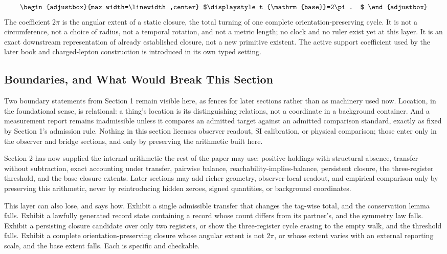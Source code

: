 \begin{equation*}
\begin{adjustbox}{max width=\linewidth,center}
$\displaystyle
t_{\mathrm{base}}=2\pi .
$
\end{adjustbox}
\end{equation*}
The coefficient \(2\pi\) is the angular extent of a static closure, the total turning of one complete orientation-preserving cycle. It is not a circumference, not a choice of radius, not a temporal rotation, and not a metric length; no clock and no ruler exist yet at this layer. It is an exact downstream representation of already established closure, not a new primitive existent. The active support coefficient used by the later book and charged-lepton construction is introduced in its own typed setting.

\subsection{Boundaries, and What Would Break This Section}
Two boundary statements from Section 1 remain visible here, as fences for later sections rather than as machinery used now. Location, in the foundational sense, is relational: a thing's location is its distinguishing relations, not a coordinate in a background container. And a measurement report remains inadmissible unless it compares an admitted target against an admitted comparison standard, exactly as fixed by Section 1's admission rule. Nothing in this section licenses observer readout, SI calibration, or physical comparison; those enter only in the observer and bridge sections, and only by preserving the arithmetic built here.

Section 2 has now supplied the internal arithmetic the rest of the paper may use: positive holdings with structural absence, transfer without subtraction, exact accounting under transfer, pairwise balance, reachability-implies-balance, persistent closure, the three-register threshold, and the base closure extents. Later sections may add richer geometry, observer-local readout, and empirical comparison only by preserving this arithmetic, never by reintroducing hidden zeroes, signed quantities, or background coordinates.

This layer can also lose, and says how. Exhibit a single admissible transfer that changes the tag-wise total, and the conservation lemma falls. Exhibit a lawfully generated record state containing a record whose count differs from its partner's, and the symmetry law falls. Exhibit a persisting closure candidate over only two registers, or show the three-register cycle erasing to the empty walk, and the threshold falls. Exhibit a complete orientation-preserving closure whose angular extent is not \(2\pi\), or whose extent varies with an external reporting scale, and the base extent falls. Each is specific and checkable.

